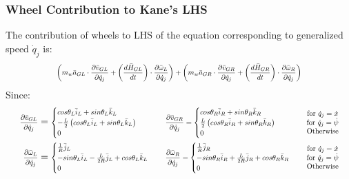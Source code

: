 \documentclass[a4paper,10pt]{article}
\newcommand\scalemath[2]{\scalebox{#1}{\mbox{\ensuremath{\displaystyle #2}}}}
\begin{document}
\subsubsection{Wheel Contribution to Kane's LHS}
The contribution of wheels to LHS of the equation corresponding to generalized speed $\dot{q}_j$ is:
\begin{align}
\scalemath{0.75}{
   \left( m_w \bar{a}_{GL} \cdot \frac{\partial \bar{v}_{GL}}{\partial \dot{q}_j} + \left( \frac{d\bar{H}_{GL}}{dt} \right) \cdot \frac{\partial \bar\omega_L}{\partial \dot{q}_j} \right)
 + \left( m_w \bar{a}_{GR} \cdot \frac{\partial \bar{v}_{GR}}{\partial \dot{q}_j} + \left( \frac{d\bar{H}_{GR}}{dt} \right) \cdot \frac{\partial \bar\omega_R}{\partial \dot{q}_j} \right)} \label{kanesWheels1}
\end{align}
Since:
\begin{align}
 \scalemath{0.75}{\frac{\partial \bar{v}_{GL}}{\partial \dot{q}_j}} &= 
 \scalemath{0.75}{\begin{cases}
  cos\theta_L\bar{i}_L+sin\theta_L\bar{k}_L \\ -\frac{L}{2}\left(cos\theta_L\bar{i}_L+sin\theta_L\bar{k}_L\right)\\ 0
 \end{cases}}
 &&\scalemath{0.75}{\frac{\partial \bar{v}_{GR}}{\partial \dot{q}_j} =  
 \begin{cases}
  cos\theta_R\bar{i}_R+sin\theta_R\bar{k}_R \\ \frac{L}{2}\left(cos\theta_R\bar{i}_R+sin\theta_R\bar{k}_R\right) \\ 0
 \end{cases}} &
 \scalemath{0.75}{\begin{matrix}
  \mbox{for } \dot{q}_j = \dot{x} \\
  \mbox{for } \dot{q}_j = \dot\psi \\
  \mbox{Otherwise}
 \end{matrix}} \\
 \scalemath{0.75}{\frac{\partial \bar\omega_L}{\partial \dot{q}_j}} &= 
 \scalemath{0.75}{\begin{cases}
  \frac{1}{R}\bar{j}_L \\ -sin\theta_L\bar{i}_L-\frac{L}{2R}\bar{j}_L+cos\theta_L\bar{k}_L \\ 0
 \end{cases}} 
 &&\scalemath{0.75}{\frac{\partial \bar\omega_R}{\partial \dot{q}_j} =  
 \begin{cases}
  \frac{1}{R}\bar{j}_R \\ -sin\theta_R\bar{i}_R+\frac{L}{2R}\bar{j}_R+cos\theta_R\bar{k}_R \\ 0
 \end{cases}} &
 \scalemath{0.75}{\begin{matrix}
  \mbox{for } \dot{q}_j = \dot{x} \\
  \mbox{for } \dot{q}_j = \dot\psi \\
  \mbox{Otherwise}
 \end{matrix}}
\end{align}
\end{document}
